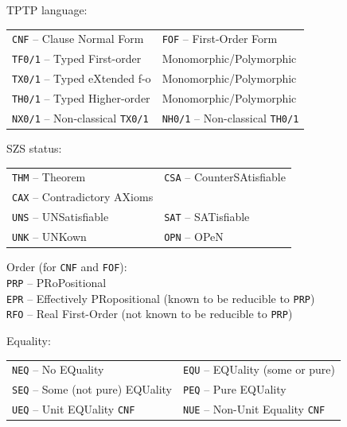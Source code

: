 \documentclass{easychair}
\newenvironment{packed_itemize}{
\vspace*{-0.2em}
\begin{itemize}
\setlength{\partopsep}{0pt}
\setlength{\itemsep}{1pt}
\setlength{\parskip}{0pt}
\setlength{\parsep}{0pt}
}{\end{itemize}}
\begin{document}
\begin{figure}[bht]
\centering
\begin{packed_itemize}
\item TPTP language: \\
      \begin{tabular}{@{}p{5cm}l}
      {\tt CNF} -- Clause Normal Form &
      {\tt FOF} -- First-Order Form \\
      {\tt TF0/1} -- Typed First-order & Monomorphic/Polymorphic \\
      {\tt TX0/1} -- Typed eXtended f-o & Monomorphic/Polymorphic \\
      {\tt TH0/1} -- Typed Higher-order & Monomorphic/Polymorphic \\
      {\tt NX0/1} -- Non-classical {\tt TX0/1} &
      {\tt NH0/1} -- Non-classical {\tt TH0/1} \\
      \end{tabular}
\item SZS status: \\
      \begin{tabular}{@{}p{5cm}l}
      {\tt THM} -- Theorem &
      {\tt CSA} -- CounterSAtisfiable \\
      {\tt CAX} -- Contradictory AXioms & \\
      {\tt UNS} -- UNSatisfiable &
      {\tt SAT} -- SATisfiable \\
      {\tt UNK} -- UNKown &
      {\tt OPN} -- OPeN \\
      \end{tabular}
\item Order (for {\tt CNF} and {\tt FOF}): \\
      {\tt PRP} -- PRoPositional \\
      {\tt EPR} -- Effectively PRopositional (known to be reducible to {\tt PRP}) \\
      {\tt RFO} -- Real First-Order (not known to be reducible to {\tt PRP})
\item Equality: \\
      \begin{tabular}{@{}p{5cm}l}
      {\tt NEQ} -- No EQuality &
      {\tt EQU} -- EQUality (some or pure) \\
      {\tt SEQ} -- Some (not pure) EQUality &
      {\tt PEQ} -- Pure EQUality \\
      {\tt UEQ} -- Unit EQUality {\tt CNF} &
      {\tt NUE} -- Non-Unit Equality {\tt CNF} \\
      \end{tabular}

\end{packed_itemize}
\end{figure}
\end{document}

